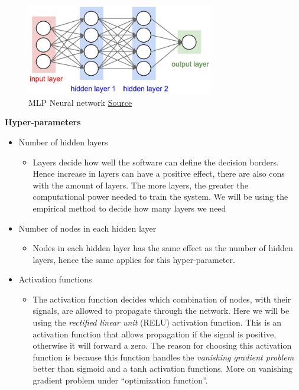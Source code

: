 \documentclass[Report.tex]{subfiles}
\begin{document}
  \begin{figure}[H]
    \centering
    \includegraphics[height=4cm]{res/neural_net2.jpeg}
    \caption{MLP Neural network \href{http://cs231n.github.io/neural-networks-1/}{Source}}
    \label{fig:neural_net2}
  \end{figure}


  \begin{flushleft}
    \textbf{Hyper-parameters}
    \begin{itemize}
     \item{Number of hidden layers}
     \begin{itemize}
      \item{Layers decide how well the software can define the decision borders. Hence increase in layers can have a positive effect, there are also cons with the amount of layers. The more layers, the greater the computational power needed to train the system. We will be using the empirical method to decide how many layers we need}
     \end{itemize}
     \item{Number of nodes in each hidden layer}
     \begin{itemize}
      \item{Nodes in each hidden layer has the same effect as the number of hidden layers, hence the same applies for this hyper-parameter.}
     \end{itemize}
     \item{Activation functions}
     \begin{itemize}
      \item{The activation function decides which combination of nodes, with their signals, are allowed to propagate through the network. Here we will be using the \textit{rectified linear unit} (RELU) activation function. This is an activation function that allows propagation if the signal is positive, otherwise it will forward a zero. The reason for choosing this activation function is because this function handles the \textit{vanishing gradient problem} better than sigmoid and a tanh activation functions. More on vanishing gradient problem under ``optimization function''.}

\end{itemize}
\end{itemize}
\end{flushleft}
\end{document}

